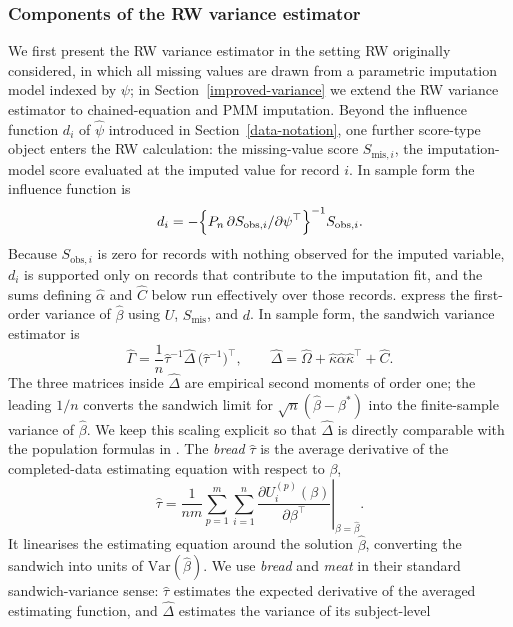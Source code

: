 \subsubsection{Components of the RW variance estimator}
We first present the RW variance estimator in the setting RW originally
considered, in which all missing values are drawn from a parametric
imputation model indexed by \(\psi\); in
Section~\ref{improved-variance} we extend the RW variance estimator to
chained-equation and PMM imputation.  Beyond the influence function
\(d_i\) of \(\hat\psi\) introduced in Section~\ref{data-notation}, one
further score-type object enters the RW calculation: the missing-value
score \(S_{\mathrm{mis},i}\), the imputation-model score evaluated at
the imputed value for record \(i\).  In sample form the influence
function is
\[
d_i
=
-\Bigl\{P_n\,\partial S_{\mathrm{obs},i}/\partial\psi^\top\Bigr\}^{-1}
S_{\mathrm{obs},i}.
\]
Because \(S_{\mathrm{obs},i}\) is zero for records with nothing observed
for the imputed variable, \(d_i\) is supported only on records that
contribute to the imputation fit, and the sums defining \(\widehat\alpha\)
and \(\widehat C\) below run effectively over those records.
\citet{robins2000inference} express the first-order variance of
\(\hat\beta\) using \(U\), \(S_{\mathrm{mis}}\), and \(d\).  In sample
form, the sandwich variance estimator is
\[
\widehat\Gamma
=
\frac{1}{n}\widehat\tau^{-1}\widehat\Delta\,\bigl(\widehat\tau^{-1}\bigr)^{\!\top},
\qquad
\widehat\Delta
=
\widehat\Omega
+\widehat\kappa\widehat\alpha\widehat\kappa^\top
+\widehat C .
\]
The three matrices inside \(\widehat\Delta\) are empirical second moments
of order one; the leading \(1/n\) converts the sandwich limit for
\(\sqrt n(\hat\beta-\beta^\ast)\) into the finite-sample variance of
\(\hat\beta\).  We keep this scaling explicit so that \(\widehat\Delta\)
is directly comparable with the population formulas in
\citet{robins2000inference}.
The \emph{bread} \(\widehat\tau\) is the average derivative of the
completed-data estimating equation with respect to \(\beta\),
\[
\widehat\tau
=
\frac{1}{nm}\sum_{p=1}^m\sum_{i=1}^n
\left.\frac{\partial U_i^{(p)}(\beta)}{\partial\beta^\top}
\right|_{\beta=\hat\beta}.
\]
It linearises the estimating equation around the solution
\(\hat\beta\), converting the sandwich into units of
\(\mathrm{Var}(\hat\beta)\).  We use \emph{bread} and \emph{meat} in
their standard sandwich-variance sense: \(\widehat\tau\) estimates the
expected derivative of the averaged estimating function, and
\(\widehat\Delta\) estimates the variance of its subject-level
